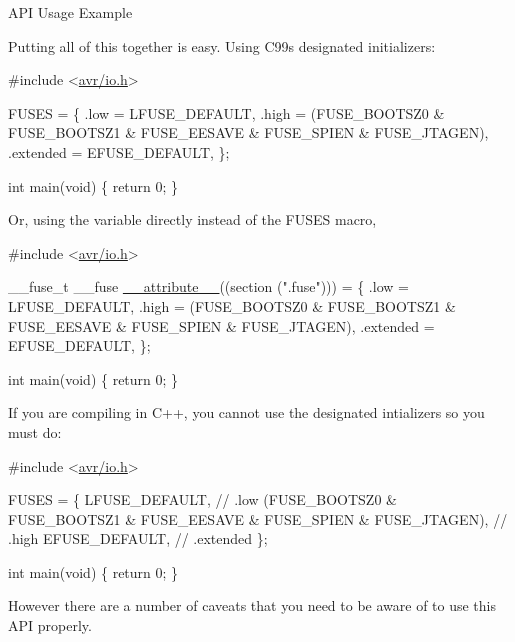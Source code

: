 \begin{DoxyParagraph}{A\+PI Usage Example}

\end{DoxyParagraph}
Putting all of this together is easy. Using C99\textquotesingle{}s designated initializers\+:


\begin{DoxyCode}
\textcolor{preprocessor}{#include <\hyperlink{io_8h}{avr/io.h}>}

FUSES = 
\{
    .low = LFUSE\_DEFAULT,
    .high = (FUSE\_BOOTSZ0 & FUSE\_BOOTSZ1 & FUSE\_EESAVE & FUSE\_SPIEN & FUSE\_JTAGEN),
    .extended = EFUSE\_DEFAULT,
\};

\textcolor{keywordtype}{int} main(\textcolor{keywordtype}{void})
\{
    \textcolor{keywordflow}{return} 0;
\}
\end{DoxyCode}


Or, using the variable directly instead of the F\+U\+S\+ES macro,


\begin{DoxyCode}
\textcolor{preprocessor}{#include <\hyperlink{io_8h}{avr/io.h}>}

\_\_fuse\_t \_\_fuse \hyperlink{stdint_8h_a772744ca0816d59e120b8f8a1ede64f0}{\_\_attribute\_\_}((section (\textcolor{stringliteral}{".fuse"}))) = 
\{
    .low = LFUSE\_DEFAULT,
    .high = (FUSE\_BOOTSZ0 & FUSE\_BOOTSZ1 & FUSE\_EESAVE & FUSE\_SPIEN & FUSE\_JTAGEN),
    .extended = EFUSE\_DEFAULT,
\};

\textcolor{keywordtype}{int} main(\textcolor{keywordtype}{void})
\{
    \textcolor{keywordflow}{return} 0;
\}
\end{DoxyCode}


If you are compiling in C++, you cannot use the designated intializers so you must do\+:


\begin{DoxyCode}
\textcolor{preprocessor}{#include <\hyperlink{io_8h}{avr/io.h}>}

FUSES = 
\{
    LFUSE\_DEFAULT, \textcolor{comment}{// .low}
    (FUSE\_BOOTSZ0 & FUSE\_BOOTSZ1 & FUSE\_EESAVE & FUSE\_SPIEN & FUSE\_JTAGEN), \textcolor{comment}{// .high}
    EFUSE\_DEFAULT, \textcolor{comment}{// .extended}
\};

\textcolor{keywordtype}{int} main(\textcolor{keywordtype}{void})
\{
    \textcolor{keywordflow}{return} 0;
\}
\end{DoxyCode}


However there are a number of caveats that you need to be aware of to use this A\+PI properly.

